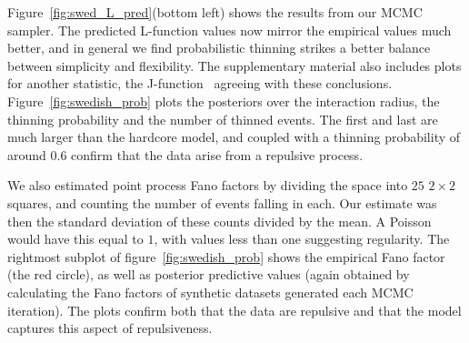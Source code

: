 \documentclass{statsoc}
\begin{document}

Figure~\ref{fig:swed_L_pred}(bottom left) shows the results from our MCMC sampler. 
The predicted  L-function values now mirror the empirical values much better, and in general we find probabilistic thinning strikes a 
better balance between simplicity and flexibility. The supplementary material also includes plots for another statistic,
the J-function~\citep{vanLies96} agreeing with these conclusions.
Figure~\ref{fig:swedish_prob} plots the posteriors over the interaction radius, the thinning probability and the number of thinned events.
The first and last are much larger than the hardcore model, and coupled with a thinning probability of around $0.6$ confirm that the data arise
from a repulsive process. 

We also estimated point process Fano factors by
dividing the space into $25$ $2 \times 2$ squares, and counting the number of events falling in each. Our estimate was then the standard 
deviation of these counts divided by the mean. A Poisson would have this equal to $1$, with values less than one suggesting regularity. The
rightmost subplot of figure~\ref{fig:swedish_prob} shows the empirical Fano factor (the red circle), as well as posterior predictive values 
(again obtained by calculating the Fano factors of synthetic datasets generated each MCMC iteration).
The plots confirm both that the data are repulsive and that the model captures this aspect of repulsiveness.
\end{document}
